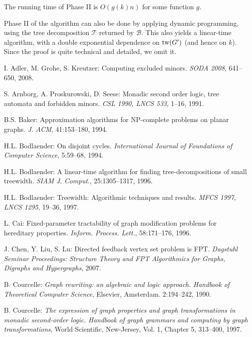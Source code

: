 \documentclass{llncs}
\begin{document}
The running time of Phase II is $O(g(k)n)$ for some function $g$.

\begin{remark}
Phase II of the algorithm can also be done by applying dynamic programming,
using the tree decomposition $\mathcal{T}$ returned by $\mathcal{B}$.
This also yields a linear-time algorithm, with a double exponential dependence on $\textup{tw}(G')$ (and hence on $k$).
Since the proof is quite technical and detailed, we omit it.
\end{remark}

\begin{thebibliography}{99}

I. Adler, M. Grohe, S. Kreutzer: Computing excluded minors.
\emph{SODA 2008}, 641--650, 2008.

S. Arnborg, A. Proskurowski, D. Seese: Monadic second order logic, tree automata and forbidden minors.
\emph{CSL 1990, LNCS 533}, 1--16, 1991.


B.S. Baker: Approximation algorithms for NP-complete problems on planar graphs.
\emph{J. ACM}, 41:153--180, 1994.

H.L. Bodlaender: On disjoint cycles.
\emph{International Journal of Foundations of Computer Science}, 5:59--68, 1994.

H.L. Bodlaender: A linear-time algorithm for finding tree-decompositions of small treewidth.
\emph{SIAM J. Comput.}, 25:1305--1317, 1996.

H.L. Bodlaender: Treewidth: Algorithmic techniques and results.
\emph{MFCS 1997, LNCS 1295}, 19--36, 1997.



L. Cai:
Fixed-parameter tractability of graph modification problems for hereditary properties.
\emph{Inform. Process. Lett.}, 58:171--176, 1996.

J. Chen, Y. Liu, S. Lu:
Directed feedback vertex set problem is FPT.
\emph{Dagstuhl Seminar Proceedings: Structure Theory and FPT Algorithmics for Graphs, Digraphs and Hypergraphs}, 2007.

B. Courcelle: \emph{Graph rewriting: an algebraic and logic approach. Handbook of Theoretical Computer Science},
Elsevier, Amsterdam.  2:194--242, 1990.

B. Courcelle:
\emph{The expression of graph properties and graph transformations in monadic second-order logic.
Handbook of graph grammars and computing by graph transformations}, World Scientific, New-Jersey,
Vol. 1, Chapter 5, 313--400, 1997.


\end{thebibliography}
\end{document}
